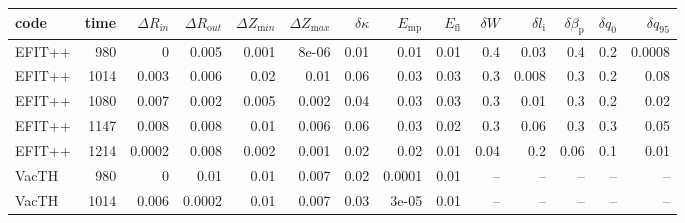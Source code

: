 \begin{table}
\centering

\begin{tabular}{lrrrrrrrrrrrrr}
\toprule
   code &  time &  $\Delta R_{\mathrm in}$ &  $\Delta R_{\mathrm out}$ &  $\Delta Z_{\mathrm min}$ &  $\Delta Z_{\mathrm max}$ &  $\delta \kappa$ &  $E_\mathrm{mp}$ &  $E_\mathrm{fl}$ &  $\delta W$ &  $\delta l_{\mathrm i}$ &  $\delta \beta_{\mathrm p}$ &  $\delta q_0$ &  $\delta q_{95}$ \\
\midrule
 EFIT++ &  980 &               0 &            0.005 &        0.001 &        8e-06 &                   0.01 &        0.01 &        0.01 &           0.4 &           0.03 &               0.4 &            0.2 &          0.0008 \\
 EFIT++ & 1014 &           0.003 &            0.006 &         0.02 &         0.01 &                   0.06 &        0.03 &        0.03 &           0.3 &          0.008 &               0.3 &            0.2 &            0.08 \\
 EFIT++ & 1080 &           0.007 &            0.002 &        0.005 &        0.002 &                   0.04 &        0.03 &        0.03 &           0.3 &           0.01 &               0.3 &            0.2 &            0.02 \\
 EFIT++ & 1147 &           0.008 &            0.008 &         0.01 &        0.006 &                   0.06 &        0.03 &        0.02 &           0.3 &           0.06 &               0.3 &            0.3 &            0.05 \\
 EFIT++ & 1214 &          0.0002 &            0.008 &        0.002 &        0.001 &                   0.02 &        0.02 &        0.01 &          0.04 &            0.2 &              0.06 &            0.1 &            0.01 \\
  VacTH &  980 &               0 &             0.01 &         0.01 &        0.007 &                   0.02 &      0.0001 &        0.01 &           -- &            -- &               -- &            -- &             -- \\
  VacTH & 1014 &           0.006 &           0.0002 &         0.01 &        0.007 &                   0.03 &       3e-05 &        0.01 &           -- &            -- &               -- &            -- &             -- \\

\end{tabular}
\end{table}
